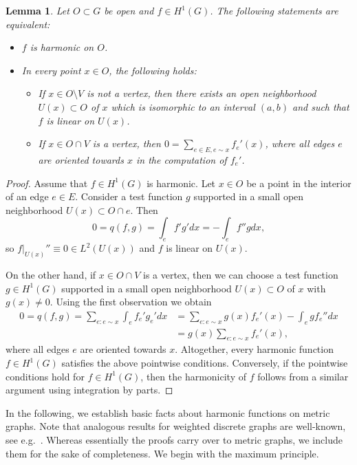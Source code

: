 \documentclass[reqno]{amsart}
\theoremstyle{plain}
\newtheorem{lem}[thm]{Lemma}
\theoremstyle{definition}
\theoremstyle{remark}
\numberwithin{equation}{section}
\begin{document}
\begin{lem} \label{Prop: characterization harmonicity} Let $O \subset G$ be open and $f \in H^1(G)$. The following statements are equivalent: 
				\begin{itemize}
					\item [(i)]  $f$ is harmonic on $O$. 
					\item [(ii)] In every point $x \in O$, the following holds:
				\begin{itemize}
				\item If $x \in O \setminus V$ is not a vertex, then there exists an open neighborhood $U(x) \subset O$ of $x$ which is isomorphic to an interval $(a,b)$ and such that $f$ is linear on $U(x)$.
				\item If $x \in O \cap V$ is a vertex, then $0 = \sum_{e \in E, e \sim x } f_e'(x)$, where all edges $e$ are oriented towards $x$ in the computation of $f_e'$. 
						\end{itemize}
					\end{itemize}
			\end{lem}
	\begin{proof}
Assume that $f  \in H^1(G)$ is harmonic. Let $x \in  O$ be a point in the interior of an edge $e \in E$. Consider a test function $g$ supported in a small open neighborhood $U(x) \subset O \cap e$. Then
\[
					0= q(f,g)= \int_{e} f' g' d x = - \int_{e} f'' g d x,
\]
					so $f \big|_{U(x)}'' \equiv 0 \in L^2(U(x))$ and $f$ is linear on $U(x)$.

On the other hand, if $x \in O \cap V$ is a vertex, then we can choose a test function $g \in H^1(G)$ supported in a small open neighborhood $U(x) \subset O$ of $x$ with $g(x) \neq 0$. Using the first observation we obtain
					\begin{align*}
							0 = q(f,g)  = \sum_{e: e\sim x} \int_{e} f_e' g_e' d x &= \sum_{e: e \sim x } g(x)f_{e}'(x) - \int_{e} g f_{e}'' d x \\&= g(x)\sum_{e: e \sim x} f_{e}'(x) , 
						\end{align*}
					where all edges $e$ are  oriented towards $x$. Altogether, every harmonic function $f \in H^1(G)$ satisfies the above pointwise conditions. Conversely, if the pointwise conditions hold for $f \in H^1(G)$, then the harmonicity of $f$ follows from a similar argument using integration by parts.
		\end{proof}


In the following, we establish basic facts about harmonic functions on metric graphs. Note that analogous results for weighted discrete graphs are well-known, see e.g.~\cite{grigoryanbook}. Whereas essentially the proofs carry over to metric graphs, we include them for the sake of completeness. We begin with the maximum principle.
\end{document}
